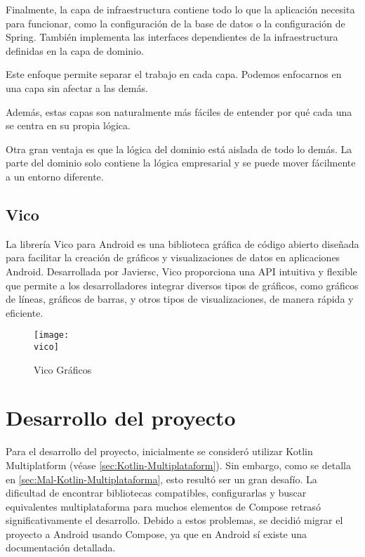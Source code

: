 \documentclass[12pt,twoside,titlepage]{report}
\newcommand{\vico}{images/vico.png}
\begin{document}
Finalmente, la capa de infraestructura contiene todo lo que la aplicación necesita para funcionar, como la configuración de la base de datos o la configuración de Spring. También implementa las interfaces dependientes de la infraestructura definidas en la capa de dominio.

Este enfoque permite separar el trabajo en cada capa. Podemos enfocarnos en una capa sin afectar a las demás.

Además, estas capas son naturalmente más fáciles de entender por qué cada una se centra en su propia lógica.

Otra gran ventaja es que la lógica del dominio está aislada de todo lo demás. La parte del dominio solo contiene la lógica empresarial y se puede mover fácilmente a un entorno diferente.

\subsection{Vico}
\label{sec:vico}

La librería Vico para Android es una biblioteca gráfica de código abierto diseñada para facilitar la creación de gráficos y visualizaciones de datos en aplicaciones Android. Desarrollada por Javiersc, Vico proporciona una API intuitiva y flexible que permite a los desarrolladores integrar diversos tipos de gráficos, como gráficos de líneas, gráficos de barras, y otros tipos de visualizaciones, de manera rápida y eficiente.

\begin{figure}[H]
    \centering
	\texttt{[image: \\vico]}
    \caption{Vico Gráficos}
    \label{fig:Log-In}
\end{figure}


\section{Desarrollo del proyecto}

Para el desarrollo del proyecto, inicialmente se consideró utilizar Kotlin Multiplatform (véase \ref{sec:Kotlin-Multiplataform}). Sin embargo, como se detalla en \ref{sec:Mal-Kotlin-Multiplataforma}, esto resultó ser un gran desafío. La dificultad de encontrar bibliotecas compatibles, configurarlas y buscar equivalentes multiplataforma para muchos elementos de Compose retrasó significativamente el desarrollo. Debido a estos problemas, se decidió migrar el proyecto a Android usando Compose, ya que en Android sí existe una documentación detallada.
\end{document}
